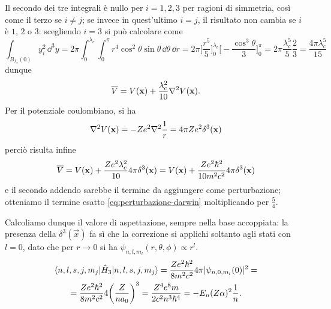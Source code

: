 Il secondo dei tre integrali è nullo per $i=1,2,3$ per ragioni di simmetria, cos\`i come il terzo se $i\ne j$; se invece in quest'ultimo $i=j$, il risultato non cambia se $i$ è $1$, $2$ o $3$: scegliendo $i=3$ si può calcolare come
\begin{equation}
    \int_{B_{\lambda_c}(0)}y_i^2\,\dd^3y=
    2\pi\int_0^{\lambda_c}\int_0^\pi r^4\cos^2\theta \sin\theta\,\dd\theta\,\dd r=
    2\pi\biggl[\frac{r^5}5\biggr]_0^{\lambda_c}\biggl[-\frac{\cos^3\theta}3\biggr]_0^\pi=
    2\pi\frac{\lambda_c^5}5\frac23=
    \frac{4\pi\lambda_c^5}{15}
\end{equation}
dunque
\begin{equation}
    \overline{V}=
    V(\mathbf{x})+\frac{\lambda_c^2}{10}\nabla^2 V(\mathbf{x}).
\end{equation}
Per il potenziale coulombiano, si ha
\begin{equation}
    \nabla^2 V(\mathbf{x})=
    -Ze^2\nabla^2\frac1{r}=
    4\pi Ze^2\delta^3(\mathbf{x})
\end{equation}
perciò risulta infine
\begin{equation}
    \overline{V}=
    V(\mathbf{x})+\frac{Ze^2\lambda_c^2}{10}4\pi\delta^3(\mathbf{x})=
    V(\mathbf{x})+\frac{Ze^2\hbar^2}{10m^2c^2}4\pi\delta^3(\mathbf{x})
\end{equation}
e il secondo addendo sarebbe il termine da aggiungere come perturbazione; otteniamo il termine esatto \eqref{eq:perturbazione-darwin} moltiplicando per $\frac54$.

Calcoliamo dunque il valore di aspettazione, sempre nella base accoppiata: la presenza della $\delta^3(\vec x)$ fa s\`i che la correzione si applichi soltanto agli stati con $l=0$, dato che per $r\to 0$ si ha $\psi_{n,l,m_l}(r,\theta,\phi)\propto r^l$.
\begin{multline}
    \langle n,l,s,j,m_j\rvert\hat{H}_3\lvert n,l,s,j,m_j\rangle=
    \frac{Ze^2\hbar^2}{8m^2c^2}4\pi\lvert\psi_{n,0,m_l}(0)\rvert^2=\\=
    \frac{Ze^2\hbar^2}{8m^2c^2}4\biggl(\frac{Z}{na_0}\biggr)^3=
    \frac{Z^4e^8m}{2c^2n^3\hbar^4}=
    -E_n(Z\alpha)^2\frac1{n}.
    \label{eq:correzione-darwin}
\end{multline}

